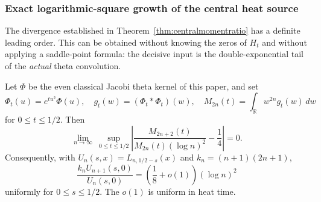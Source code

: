 \subsubsection{Exact logarithmic-square growth of the central heat source}
\label{subsec:theta-central-asymptotic}
The divergence established in
Theorem~\ref{thm:centralmomentratio}
has a definite leading order.
This can be obtained without knowing the zeros of
$H_t$ and without applying a saddle-point formula:
the decisive input is the double-exponential
tail of the \emph{actual} theta convolution.

\begin{theorem}
\label{thm:theta-central-logsquare}
Let $\Phi$ be the even classical Jacobi theta kernel
of this paper, and set
\[
\Phi_t(u)=e^{tu^2}\Phi(u),\quad
g_t(w)=(\Phi_t*\Phi_t)(w),\quad
M_{2n}(t)=\int_{\mathbb R}w^{2n}g_t(w)\,dw
\]
for $0\le t\le1/2$. Then
\begin{equation}\label{eq:uniformmomentasymptotic}
\boxed{\lim_{n\to\infty}\ \sup_{0\le t\le1/2}
\left|
\frac{M_{2n+2}(t)}
{M_{2n}(t)(\log n)^2}-\frac14\right|=0.}
\end{equation}
Consequently, with $U_n(s,x)=L_{n,1/2-s}(x)$
and $k_n=(n+1)(2n+1)$,
\begin{equation}\label{eq:centralexactgrowth}
\boxed{
\frac{k_nU_{n+1}(s,0)}{U_n(s,0)}
=\left(\frac18+o(1)\right)(\log n)^2}
\end{equation}
uniformly for $0\le s\le1/2$.
The $o(1)$ is uniform in heat time.
\end{theorem}

